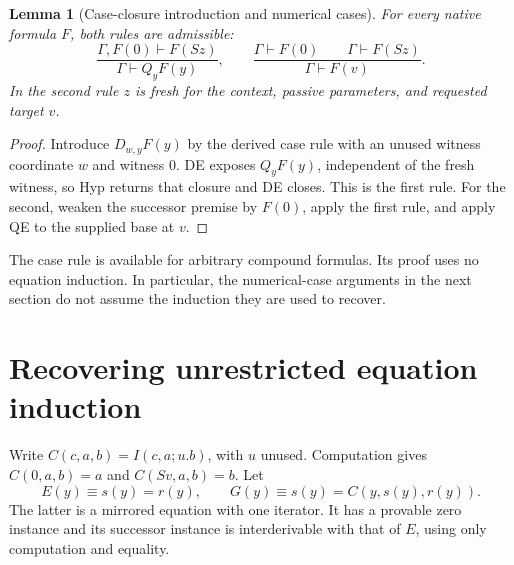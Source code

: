 \documentclass[11pt]{article}
\newtheorem{lemma}[theorem]{Lemma}
\theoremstyle{definition}\newtheorem{definition}[theorem]{Definition}
\begin{document}
\begin{lemma}[Case-closure introduction and numerical cases]\label{lem:ncases}
For every native formula $F$, both rules are admissible:
\[
 \frac{\Gamma,F(0)\vdash F(Sz)}{\Gamma\vdash Q_yF(y)},
 \qquad
 \frac{\Gamma\vdash F(0)\qquad\Gamma\vdash F(Sz)}
      {\Gamma\vdash F(v)}.
\]
In the second rule $z$ is fresh for the context, passive parameters,
and requested target $v$.
\end{lemma}
\begin{proof}
Introduce $D_{w,y}F(y)$ by the derived case rule with an unused witness
coordinate $w$ and witness $0$. DE exposes $Q_yF(y)$, independent of
the fresh witness, so Hyp returns that closure and DE closes. This is
the first rule. For the second, weaken the successor premise by $F(0)$,
apply the first rule, and apply QE to the supplied base at $v$.
\end{proof}

The case rule is available for arbitrary compound formulas. Its proof
uses no equation induction. In particular, the numerical-case arguments
in the next section do not assume the induction they are used to recover.

\section{Recovering unrestricted equation induction}\label{sec:induction}

Write $C(c,a,b)=I(c,a;u.b)$, with $u$ unused. Computation gives
$C(0,a,b)=a$ and $C(Sv,a,b)=b$. Let
\[
 E(y)\equiv s(y)=r(y),\qquad
 G(y)\equiv s(y)=C(y,s(y),r(y)).                      \tag{Lift}
\]
The latter is a mirrored equation with one iterator. It has a provable
zero instance and its successor instance is interderivable with that
of $E$, using only computation and equality.
\end{document}
